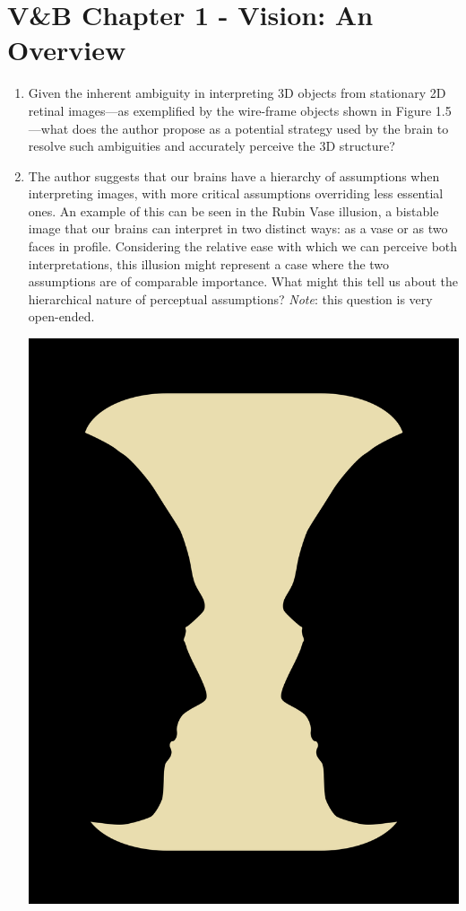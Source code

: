\documentclass[11pt,letterpaper]{article}
\begin{document}
\section{V\&B Chapter 1 - Vision: An Overview}
\begin{enumerate}
    \item Given the inherent ambiguity in interpreting 3D objects from stationary 2D retinal images—as exemplified by the wire-frame objects shown in Figure 1.5—what does the author propose as a potential strategy used by the brain to resolve such ambiguities and accurately perceive the 3D structure?
    \vspace{4 cm}
    
    \item The author suggests that our brains have a hierarchy of assumptions when interpreting images, with more critical assumptions overriding less essential ones. An example of this can be seen in the Rubin Vase illusion, a bistable image that our brains can interpret in two distinct ways: as a vase or as two faces in profile. Considering the relative ease with which we can perceive both interpretations, this illusion might represent a case where the two assumptions are of comparable importance. What might this tell us about the hierarchical nature of perceptual assumptions? \emph{Note}: this question is very open-ended.
    \begin{center}
        \includegraphics[scale=0.1]{rubin.png}
    \end{center}


\end{enumerate}
\end{document}
